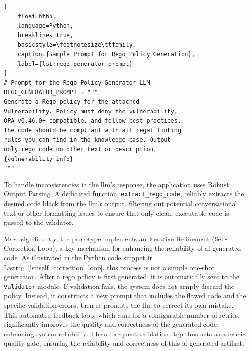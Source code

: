 \begin{lstlisting}[
    float=htbp,
    language=Python, 
    breaklines=true, 
    basicstyle=\footnotesize\ttfamily,
    caption={Sample Prompt for Rego Policy Generation},
    label={lst:rego_generator_prompt}
]
# Prompt for the Rego Policy Generator LLM
REGO_GENERATOR_PROMPT = """
Generate a Rego policy for the attached 
Vulnerability. Policy must deny the vulnerability, 
OPA v0.46.0+ compatible, and follow best practices. 
The code should be compliant with all regal linting 
rules you can find in the knowledge base. Output 
only rego code no other text or description.
{vulnerability_info}
"""
\end{lstlisting}

To handle inconsistencies in the \gls{llm}'s response, the application uses Robust Output Parsing. A dedicated function, \texttt{extract\_rego\_code}, reliably extracts the desired code block from the \gls{llm}'s output, filtering out potential conversational text or other formatting issues to ensure that only clean, executable code is passed to the validator.

Most significantly, the prototype implements an Iterative Refinement (Self-Correction Loop), a key mechanism for enhancing the reliability of \gls{ai}-generated code. As illustrated in the Python code snippet in Listing~\ref{lst:self_correction_loop}, this process is not a simple one-shot generation. After a \gls{rego} policy is first generated, it is automatically sent to the \texttt{Validator} module. If validation fails, the system does not simply discard the policy. Instead, it constructs a new prompt that includes the flawed code and the specific validation errors, then re-prompts the \gls{llm} to correct its own mistake. This automated feedback loop, which runs for a configurable number of retries, significantly improves the quality and correctness of the generated code, enhancing system reliability. The subsequent validation step thus acts as a crucial quality gate, ensuring the reliability and correctness of this \gls{ai}-generated artifact.

